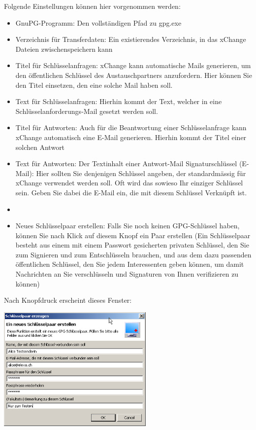 Folgende Einstellungen können hier vorgenommen werden:
\begin{itemize}
 \item GnuPG-Programm: Den vollständigen Pfad zu gpg.exe
\item Verzeichnis für Transferdaten: Ein existierendes Verzeichnis, in das xChange Dateien zwischenspeichern kann
\item Titel für Schlüsselanfragen: xChange kann automatische Mails generieren, um  den öffentlichen Schlüssel des Austauschpartners anzufordern. Hier können Sie den Titel einsetzen, den eine solche Mail haben soll.
\item Text für Schlüsselanfragen: Hierhin kommt der Text, welcher in eine Schlüsselanforderungs-Mail gesetzt werden soll.
\item Titel für Antworten: Auch für die Beantwortung einer Schlüsselanfrage kann xChange automatisch eine E-Mail generieren. Hierhin kommt der Titel einer solchen Antwort
\item Text für Antworten: Der Textinhalt einer Antwort-Mail
Signaturschlüssel (E-Mail): Hier sollten Sie denjenigen Schlüssel angeben, der standardmässig für xChange verwendet werden soll. Oft wird das sowieso Ihr einziger Schlüssel sein. Geben Sie dabei die E-Mail ein, die mit diesem Schlüssel Verknüpft ist.

\item
\item Neues Schlüsselpaar erstellen: Falls Sie noch keinen GPG-Schlüssel haben, können Sie nach Klick auf diesem Knopf ein Paar erstellen (Ein Schlüsselpaar besteht aus einem mit einem Passwort gesicherten privaten Schlüssel, den Sie zum Signieren und zum Entschlüsseln brauchen, und aus dem dazu passenden öffentlichen Schlüssel, den Sie jedem Interessenten geben können, um damit Nachrichten an Sie verschlüsseln und Signaturen von Ihnen verifizieren zu können)

\end{itemize}

Nach Knopfdruck erscheint dieses Fenster:

\includegraphics[width=3in]{images/xc2.png}

